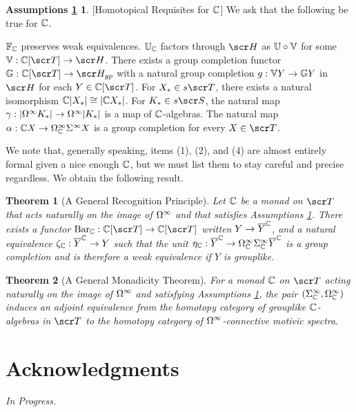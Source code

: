 \documentclass{amsart}
\newtheorem{thm}{Theorem}[section]
\theoremstyle{definition}
\newtheorem*{asses:monad}{Assumptions \ref{asses:monad}}
\begin{document}
\begin{asses:monad}\label{asses:monad}[Homotopical Requisites for $\mathbb{C}$]
We ask that the following be true for $\mathbb{C}$.
\begin{outline}[enumerate]
\1 $\mathbb{F}_{\mathbb{C}}$ preserves weak equivalences.
\1 $\mathbb{U}_{\mathbb{C}}$ factors through $\sH$ as $\mathbb{U} \circ \mathbb{V}$ for some $\bV : \bC[\sT] \to \sH$.
\1 There exists a group completion functor $\bG : \bC [\sT] \to \sH_{gp}$ with a natural group completion $g : \mathbb{V} Y \to \mathbb{G} Y$ in $\sH$ for each $Y \in \bC[\sT]$.
\1 For $X_{*} \in s\sT$, there exists a natural isomorphism $\mathbb{C} |X_{*}| \cong |\mathbb{C} X_{*}|$.
\1 For $K_{*} \in s\sS$, the natural map $\gamma : |\Omega^{\infty}K_{*}| \to \Omega^{\infty}|K_{*}|$ is a map of $\mathbb{C}$-algebras.
\1 The natural map $\alpha : \mathbb{C} X \to \Omega^{\infty}_{\mathbb{C}}\Sigma^{\infty}X$ is a group completion for every $X \in \sT$. 
\end{outline}
\end{asses:monad}

We note that, generally speaking, items (1), (2), and (4) are almost entirely formal given a nice enough $\mathbb{C}$, but we must list them to stay careful and precise regardless. We obtain the following result.

\begin{thm}[A General Recognition Principle]
Let $\mathbb{C}$ be a monad on $\sT$ that acts naturally on the image of $\Omega^{\infty}$ and that satisfies Assumptions \ref{asses:monad}. There exists a functor $\mathrm{Bar}_{\bC} : \bC [\sT] \to \bC[\sT]$ written $Y \to \overline{Y}^{\mathbb{C}}$, and a natural equivalence $\zeta_{\mathbb{C}} : \overline{Y}^{\mathbb{C}} \to Y$ such that the unit $\eta_{\mathbb{C}} : \overline{Y}^{\mathbb{C}} \to \Omega^{\infty}_{\mathbb{C}}\Sigma^{\infty}_{\mathbb{C}}\overline{Y}^{\mathbb{C}}$ is a group completion and is therefore a weak equivalence if $Y$ is grouplike.
\end{thm}

\begin{thm}[A General Monadicity Theorem]
For a monad $\mathbb{C}$ on $\sT$ acting naturally on the image of $\Omega^{\infty}$ and satisfying Assumptions \ref{asses:monad}, the pair $(\Sigma^{\infty}_{\mathbb{C}},\Omega^{\infty}_{\mathbb{C}})$ induces an adjoint equivalence from the homotopy category of grouplike $\mathbb{C}$-algebras in $\sT$ to the homotopy category of $\Omega^{\infty}$-connective motivic spectra.
\end{thm}

\section*{Acknowledgments}
\emph{In Progress.}
\end{document}
